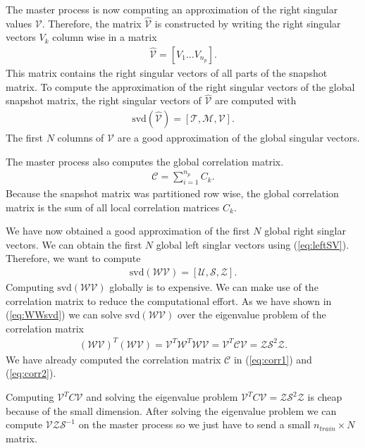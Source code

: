 The master process is now computing an approximation of the right singular values $\mathcal{V}$.
Therefore, the matrix $\hat{ \mathcal{V} }$ is constructed by writing the right singular vectors $V_k$ column wise in a matrix
\begin{align*}
\hat{ \mathcal{V} } = [V_1 ... V_{n_p}].
\end{align*}
This matrix contains the right singular vectors of all parts of the snapshot matrix.
To compute the approximation of the right singular vectors of the global snapshot matrix, the right singular vectors of $\hat{ \mathcal{V} }$ are computed with
\begin{align*}
\text{svd}( \hat{ \mathcal{V} }) = 
[\mathcal{T},\mathcal{M},\mathcal{V}].
\end{align*}
The first $N$ columns of $\mathcal{V}$ are a good approximation of the global singular vectors.

The master process also computes the global correlation matrix. 
\begin{align}
\label{eq:corr2}
\mathcal{ C } = \sum_{i=1}^{n_p} C_k.
\end{align}
Because the snapshot matrix was partitioned row wise, the global correlation matrix is the sum of all local correlation matrices $C_k$.

We have now obtained a good approximation of the first $N$ global right singlar vectors.
We can obtain the first $N$ global left singlar vectors using (\ref{eq:leftSV}).
Therefore, we want to compute
\begin{align*}
\text{svd}( \mathcal{ W }\mathcal{V} ) =
[\mathcal{U}, \mathcal{S}, \mathcal{Z}].
\end{align*}
Computing $ \text{svd} ( \mathcal{ W } \mathcal{V} ) $ globally is to expensive. We can make use of the correlation matrix to reduce the computational effort.
As we have shown in (\ref{eq:WWsvd}) we can solve $ \text{svd} ( \mathcal{ W } \mathcal{V} ) $ over the eigenvalue problem of the correlation matrix
\begin{align*}
(\mathcal{W}\mathcal{V})^T(\mathcal{W}\mathcal{V}) = 
\mathcal{V}^T \mathcal{W}^T\mathcal{W}\mathcal{V}  =
\mathcal{V}^T \mathcal{ C } \mathcal{V} = 
\mathcal{Z} \mathcal{S}^2 \mathcal{Z}.
\end{align*}
We have already computed the correlation matrix $\mathcal{ C }$ in (\ref{eq:corr1}) and (\ref{eq:corr2}).

Computing $\mathcal{V}^T C \mathcal{V}$ and solving the eigenvalue problem $\mathcal{V}^T C \mathcal{V} = 
\mathcal{Z} \mathcal{S}^2 \mathcal{Z}$ is cheap because of the small dimension.
After solving the eigenvalue problem we can compute $ \mathcal{V} \mathcal{Z} \mathcal{S}^{-1} $ on the master process so we just have to send a small $n_{train} \times N$ matrix.

